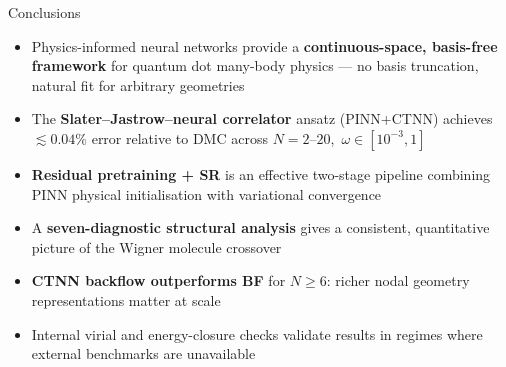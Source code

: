 \documentclass[aspectratio=169,10pt]{beamer}
\begin{document}
\begin{frame}{Conclusions}
  \begin{itemize}
    \setlength\itemsep{8pt}
    \item Physics-informed neural networks provide a \textbf{continuous-space,
          basis-free framework} for quantum dot many-body physics ---
          no basis truncation, natural fit for arbitrary geometries
    \item The \textbf{Slater--Jastrow--neural correlator} ansatz (PINN+CTNN)
          achieves $\lesssim0.04\%$ error relative to DMC
          across $N=2$--$20$,\ $\omega\in[10^{-3},1]$
    \item \textbf{Residual pretraining + SR} is an effective two-stage pipeline
          combining PINN physical initialisation with variational convergence
    \item A \textbf{seven-diagnostic structural analysis} gives a consistent,
          quantitative picture of the Wigner molecule crossover
    \item \textbf{CTNN backflow outperforms BF} for $N\ge6$:
          richer nodal geometry representations matter at scale
    \item Internal virial and energy-closure checks validate
          results in regimes where external benchmarks are unavailable
  \end{itemize}
\end{frame}
\end{document}

